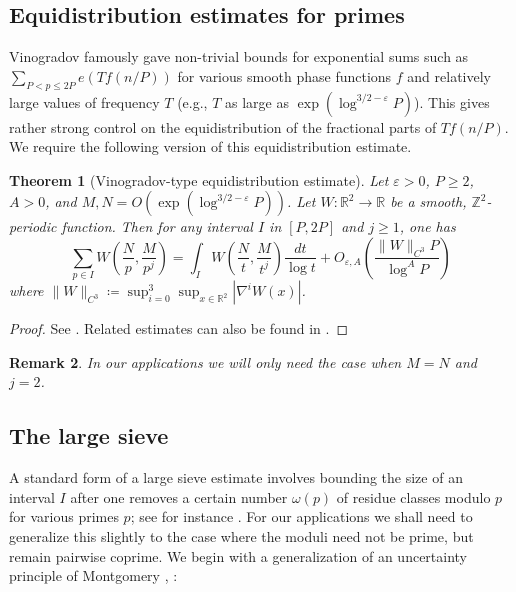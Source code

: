 \documentclass[12pt]{amsart}
\newtheorem{theorem}{Theorem}[section]
\newtheorem{remark}[theorem]{Remark}
\newcommand{\eps}{\varepsilon}
\newcommand{\R}{\mathbb{R}}
\newcommand{\Z}{\mathbb{Z}}
\begin{document}
\subsection{Equidistribution estimates for primes}

Vinogradov famously gave non-trivial bounds for exponential sums such as $\sum_{P < p \leq 2P} e(T f(n/P))$ for various smooth phase functions $f$ and relatively large values of frequency $T$ (e.g., $T$ as large as $\exp(\log^{3/2-\eps} P)$).  This gives rather strong control on the equidistribution of the fractional parts of $T f(n/P)$.  We require the following version of this equidistribution estimate.

\begin{theorem}[Vinogradov-type equidistribution estimate]\label{vinogradov}  Let $\eps>0$, $P \geq 2$, $A>0$, and $M, N = O(\exp(\log^{3/2-\eps} P))$.  Let $W \colon \R^2 \to \R$ be a smooth, $\Z^2$-periodic function.  Then for any interval $I$ in $[P,2P]$ and $j \geq 1$, one has
$$ \sum_{p \in I} W\left(\frac{N}{p}, \frac{M}{p^j}\right) = \int_I W\left(\frac{N}{t}, \frac{M}{t^j}\right) \frac{dt}{\log t} + O_{\eps,A}\left(\frac{\|W\|_{C^3} P}{\log^A P}\right)$$
where $\|W\|_{C^3} \coloneqq \sup_{i=0}^3 \sup_{x \in \R^2} |\nabla^i W(x)|$.
\end{theorem}

\begin{proof} See \cite[Proposition 1.12]{singmaster}.  Related estimates can also be found in \cite{granville-ramare}.
\end{proof}

\begin{remark}
    In our applications we will only need the case when $M=N$ and $j=2$.
\end{remark}

\subsection{The large sieve}

A standard form of a large sieve estimate involves bounding the size of an interval $I$ after one removes a certain number $\omega(p)$ of residue classes modulo $p$ for various primes $p$; see for instance \cite[Corollary 1]{montgomery-vaughan}. For our applications we shall need to generalize this slightly to the case where the moduli need not be prime, but remain pairwise coprime.  We begin with a generalization of an uncertainty principle of Montgomery \cite{montgomery-vaughan}, \cite{selberg}:
\end{document}
